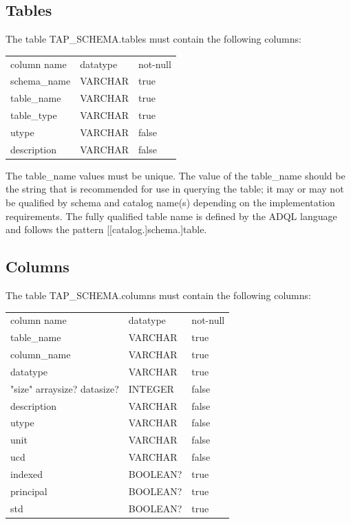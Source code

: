 \documentclass[11pt,letter]{ivoa}
\begin{document}
{\subsection{Tables}
\label{sec:tap-schema-tables}
The table TAP\_SCHEMA.tables must contain the following columns:

\begin{tabular}{l l l}
\label{tab:tap-schema-tables}
column name & datatype & not-null \\
schema\_name & VARCHAR & true \\
table\_name & VARCHAR & true \\
table\_type & VARCHAR & true \\
utype & VARCHAR & false \\
description & VARCHAR & false \\
\end{tabular}

The table\_name values must be unique. The value of the 
table\_name should be the string that is recommended for use in 
querying the table; it may or may not be qualified by schema and catalog name(s) 
depending on the implementation requirements. The fully qualified table name is 
defined by the ADQL language and follows the pattern [[catalog.]schema.]table. 

\subsection{Columns}
\label{sec:tap-schema-columns}
The table TAP\_SCHEMA.columns must contain the following columns:

\begin{tabular}{l l l}
\label{tab:tap-schema-columns}
column name & datatype & not-null \\
table\_name & VARCHAR & true \\
column\_name & VARCHAR & true \\
datatype & VARCHAR & true \\
"size" arraysize? datasize? & INTEGER & false \\
description & VARCHAR & false \\
utype & VARCHAR & false \\
unit & VARCHAR & false \\
ucd & VARCHAR & false \\
indexed & BOOLEAN? & true \\
principal & BOOLEAN? & true \\
std & BOOLEAN? & true \\
\end{tabular}

}
\end{document}
